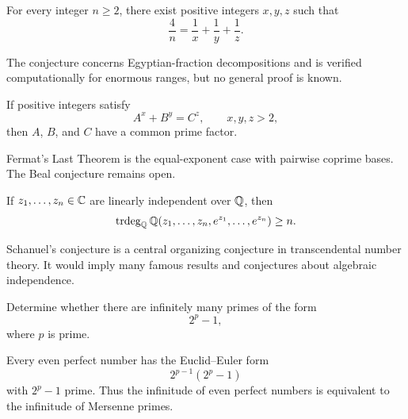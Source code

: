     \begin{conjecture}
        For every integer $n\geq 2$, there exist positive integers $x,y,z$ such that
        \[
            \frac{4}{n}
            =
            \frac{1}{x}+\frac{1}{y}+\frac{1}{z}.
        \]
    \end{conjecture}

    \begin{remark}
        The conjecture concerns Egyptian-fraction decompositions and is verified
        computationally for enormous ranges, but no general proof is known.
    \end{remark}

    \begin{conjecture}
        If positive integers satisfy
        \[
            A^x+B^y=C^z,
            \qquad
            x,y,z>2,
        \]
        then $A$, $B$, and $C$ have a common prime factor.
    \end{conjecture}

    \begin{remark}
        Fermat's Last Theorem is the equal-exponent case with pairwise coprime
        bases. The Beal conjecture remains open.
    \end{remark}

    \begin{conjecture}
        If $z_1,\dots,z_n\in\mathbb{C}$ are linearly independent over $\mathbb{Q}$, then
        \[
            \operatorname{trdeg}_{\mathbb{Q}}
            \mathbb{Q}(z_1,\dots,z_n,e^{z_1},\dots,e^{z_n})
            \geq n.
        \]
    \end{conjecture}

    \begin{remark}
        Schanuel's conjecture is a central organizing conjecture in
        transcendental number theory. It would imply many famous results and
        conjectures about algebraic independence.
    \end{remark}

    \begin{openproblem}
        Determine whether there are infinitely many primes of the form
        \[
            2^p-1,
        \]
        where $p$ is prime.
    \end{openproblem}

    \begin{remark}
        Every even perfect number has the Euclid--Euler form
        \[
            2^{p-1}(2^p-1)
        \]
        with $2^p-1$ prime. Thus the infinitude of even perfect numbers is
        equivalent to the infinitude of Mersenne primes.
    \end{remark}

